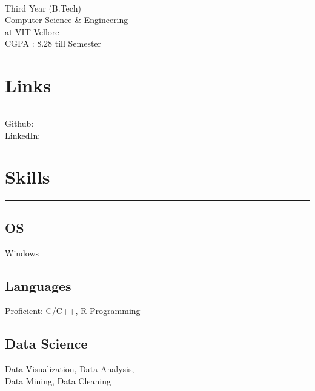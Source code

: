 \documentclass[]{meetresume-class}
\begin{document}
	
	
	\begin{minipage}[t]{0.33\textwidth} 
		\begin{large}
			\\
		\end{large}
		Third Year (B.Tech)\\
		Computer Science $\&$ Engineering\\ 
		at VIT Vellore \\ 
		CGPA : 8.28 till  Semester 
		
		
		\section{Links} 
		\noindent\rule{5cm}{0.6pt}
		
		Github: \href{https://github.com/MeetDarkPow}{} \\
		LinkedIn:  \href{https://www.linkedin.com/in/meet-bhatnagar-a41842181/}{}
		\sectionsep
		\section{Skills}
		\noindent\rule{5cm}{0.6pt}
	
		\subsection{OS}
		Windows
		\vspace{6pt}
		
		\subsection{Languages}
		Proficient: C/C++, R Programming
		\vspace{6pt}
		
		\subsection{Data Science}
		Data Visualization, Data Analysis,\\
		Data Mining, Data Cleaning
		\vspace{6pt}
		

\end{minipage}
\end{document}
